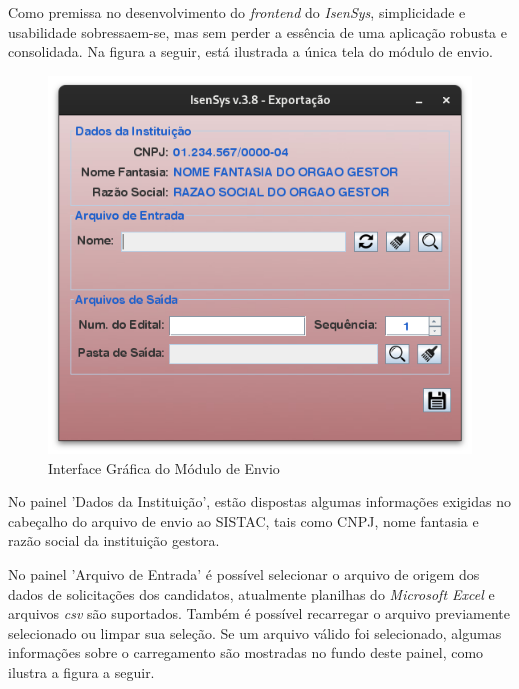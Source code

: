 \documentclass[
	12pt,			%
	openright,		%
	oneside,	
	a4paper,		%
	english,		%
	brazil			%
]{abntex2/abntex2}  %
\begin{document}
	Como premissa no desenvolvimento do \textit{frontend} do \textit{IsenSys}, simplicidade e usabilidade sobressaem-se, mas sem perder a essência de uma aplicação robusta e consolidada. Na figura a seguir, está ilustrada a única tela do módulo de envio.
	
	\begin{figure}[H]
		\begin{center}
			
			\caption{Interface Gráfica do Módulo de Envio}
			\label{envio-ui}
			
			\includegraphics[scale=0.5]{img/envio-ui}
			
		\end{center}
	\end{figure}
	
	No painel 'Dados da Instituição', estão dispostas algumas informações exigidas no cabeçalho do arquivo de envio ao SISTAC, tais como CNPJ, nome fantasia e razão social da instituição gestora.
	
	No painel 'Arquivo de Entrada' é possível selecionar o arquivo de origem dos dados de solicitações dos candidatos, atualmente planilhas do \textit{Microsoft Excel} e arquivos \textit{csv} são suportados. Também é possível recarregar o arquivo previamente selecionado ou limpar sua seleção. Se um arquivo válido foi selecionado, algumas informações sobre o carregamento são mostradas no fundo deste painel, como ilustra a figura a seguir.
	
\end{document}
